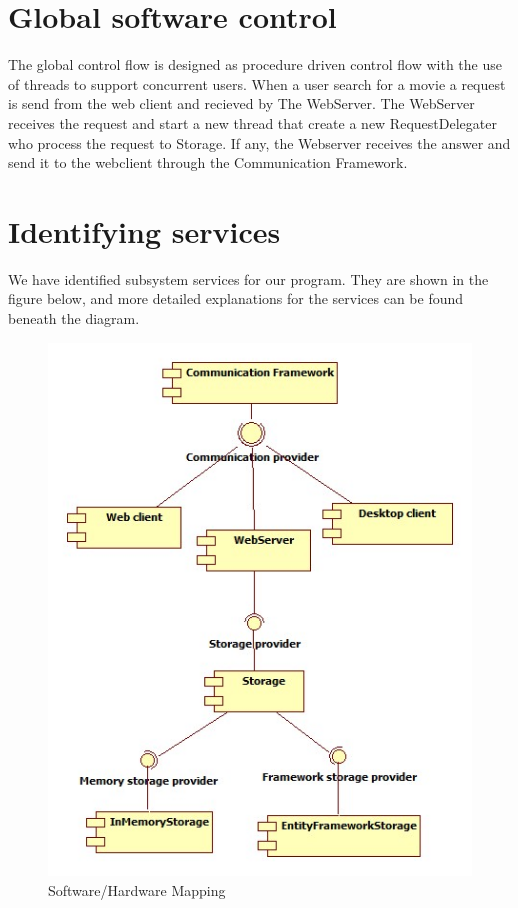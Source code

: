 \section{Global software control}
The global control flow is designed as procedure driven control flow with the use of threads to support concurrent users. When a user search for a movie a request is send from the web client and recieved by The WebServer. The WebServer receives the request and start a new thread that create a new RequestDelegater who process the request to Storage. If any, the Webserver receives the answer and send it to the webclient through the Communication Framework.

\section{Identifying services}
We have identified subsystem services for our program. They are shown in the figure below, and more detailed explanations for the services can be found beneath the diagram.

\begin{figure}[H]
\includegraphics[scale=0.8]{img/SubsystemServices.jpg}
\caption{Software/Hardware Mapping}
\label{fig:Subsystem Services}
\end{figure}


